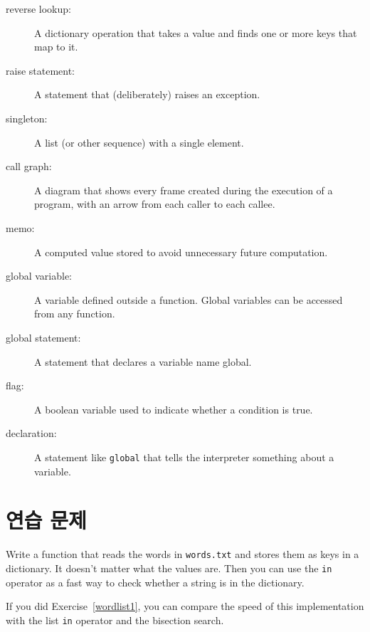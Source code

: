 \documentclass[10pt]{book}
\begin{document}
\begin{description}
\item[reverse lookup:] A dictionary operation that takes a value and finds
one or more keys that map to it.

\item[raise statement:]  A statement that (deliberately) raises an exception.

\item[singleton:] A list (or other sequence) with a single element.

\item[call graph:] A diagram that shows every frame created during
the execution of a program, with an arrow from each caller to
each callee. 

\item[memo:] A computed value stored to avoid unnecessary future 
computation.

\item[global variable:]  A variable defined outside a function.  Global
variables can be accessed from any function.

\item[global statement:]  A statement that declares a variable name
global.

\item[flag:] A boolean variable used to indicate whether a condition
is true.

\item[declaration:] A statement like {\tt global} that tells the
interpreter something about a variable.

\end{description}


\section{연습 문제}

\begin{exercise}
\label{wordlist2}

Write a function that reads the words in {\tt words.txt} and
stores them as keys in a dictionary.  It doesn't matter what the
values are.  Then you can use the {\tt in} operator
as a fast way to check whether a string is in
the dictionary.

If you did Exercise~\ref{wordlist1}, you can compare the speed
of this implementation with the list {\tt in} operator and the
bisection search.

\end{exercise}
\end{document}
